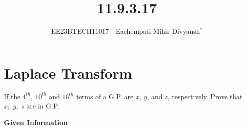 \documentclass[journal,12pt,twocolumn]{IEEEtran}
\theoremstyle{remark}
\begin{document}

\vspace{3cm}

\title{11.9.3.17}
\author{EE23BTECH11017 - Eachempati Mihir Divyansh$^{*}$%
}
\chapter{Laplace Transform}
\maketitle
\newpage
\bigskip

\renewcommand{\thefigure}{\theenumi}
\renewcommand{\thetable}{\theenumi}

\question
If the $4^{th}$, $10^{th}$ and $16^{th}$ terms of a G.P. are $x$, $y$, and $z$, respectively. Prove that $x,\; y,\; z$ are in G.P.
\\
\solution
\fi
\begin{table}[h]
    \centering
        \label{tab: 1}
                \caption{\textbf{Given Information}}
\end{table} 
\end{document}
